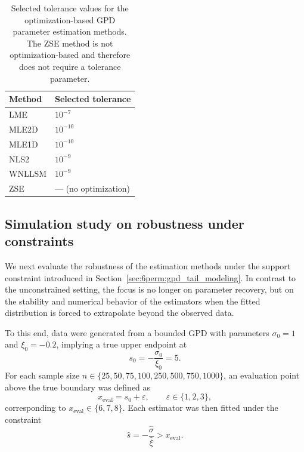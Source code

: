 \begin{table}[H]
\centering
\caption{Selected tolerance values for the optimization-based GPD parameter estimation methods. The ZSE method is not optimization-based and therefore does not require a tolerance parameter.}
\label{tab:6perm:tol_settings}
\begin{tabular}{ll}
\toprule
\textbf{Method} & \textbf{Selected tolerance} \\
\midrule
LME      & $10^{-7}$  \\
MLE2D    & $10^{-10}$ \\
MLE1D    & $10^{-10}$ \\
NLS2     & $10^{-9}$  \\
WNLLSM   & $10^{-9}$  \\
ZSE      & --- (no optimization) \\
\bottomrule
\end{tabular}
\end{table}


\subsection{Simulation study on robustness under constraints}
\label{sec:6perm:param_est:sim_constrained}

We next evaluate the robustness of the estimation methods under the support constraint introduced in Section~\ref{sec:6perm:gpd_tail_modeling}. In contrast to the unconstrained setting, the focus is no longer on parameter recovery, but on the stability and numerical behavior of the estimators when the fitted distribution is forced to extrapolate beyond the observed data.

\newpage
To this end, data were generated from a bounded GPD with parameters $\sigma_0 = 1$ and $\xi_0 = -0.2$, implying a true upper endpoint at 
\begin{equation}
s_0 = -\frac{\sigma_0}{\xi_0} = 5.
\end{equation}
For each sample size $n \in \{25, 50, 75, 100, 250, 500, 750, 1000\}$, an evaluation point above the true boundary was defined as
\begin{equation}
x_{\mathrm{eval}} = s_0 + \varepsilon, 
\qquad 
\varepsilon \in \{1, 2, 3\},
\end{equation}
corresponding to $x_{\mathrm{eval}} \in \{6, 7, 8\}$. Each estimator was then fitted under the constraint
\begin{equation}
\hat{s} = -\frac{\hat{\sigma}}{\hat{\xi}} > x_{\mathrm{eval}}.
\end{equation}

